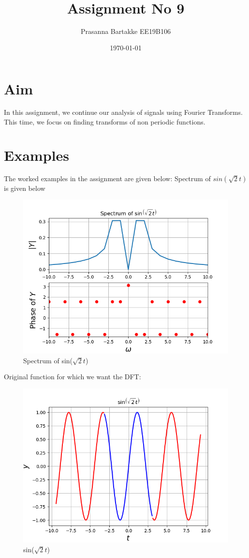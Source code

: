 \documentclass[11pt, a4paper]{article}
\title{Assignment No 9} %
\author{Prasanna Bartakke EE19B106} %
\date{\today} %
\begin{document}
		
		
\maketitle %
\section{Aim}
In this assignment, we continue our analysis of signals using Fourier Transforms. This time, we focus on finding transforms of non periodic functions. 
\section{Examples}
The worked examples in the assignment are given below:
Spectrum of $sin(\sqrt{2}t)$ is given below\newline
\begin{figure}[h!]
\centering
\includegraphics[scale=0.6]{fig0.png}
\caption{Spectrum of sin($\sqrt{2}t$)}
\label{fig:universe}
\end{figure}
\clearpage
Original function for which we want the DFT:
\begin{figure}[h!]
\centering
\includegraphics[scale=0.6]{fig1.png}
\caption{sin($\sqrt{2}t$)}
\label{fig:universe}
\end{figure}
\end{document}
